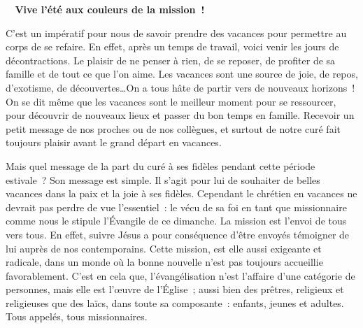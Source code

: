  \begin{center}
 \textbf{
\og 
Vive l’été aux couleurs de la mission !
 \fg{}
 }
 \end{center}

C’est un impératif pour nous de savoir prendre des vacances pour permettre au corps de se refaire. En effet, après un temps de travail, voici venir les jours de décontractions. Le plaisir de ne penser à rien, de se reposer, de profiter de sa famille et de tout ce que l’on aime. Les vacances sont une source de joie, de repos, d’exotisme, de découvertes…On a tous hâte de partir vers de nouveaux horizons ! On se dit même que les vacances sont le meilleur moment pour se ressourcer, pour découvrir de nouveaux lieux et passer du bon temps en famille. Recevoir un petit message de nos proches ou de nos collègues, et surtout de notre curé fait toujours plaisir avant le grand départ en vacances.

Mais quel message de la part du curé à ses fidèles pendant cette période estivale ? Son message est simple. Il s’agit pour lui de souhaiter de belles vacances dans la paix et la joie à ses fidèles.
Cependant le chrétien en vacances ne devrait pas perdre de vue l’essentiel : le vécu de sa foi en tant que missionnaire comme nous le stipule l’Évangile de ce dimanche. La mission est l’envoi de tous vers tous. En effet, suivre Jésus a pour conséquence d’être envoyés témoigner de lui auprès de nos contemporains.
Cette mission, est elle aussi exigeante et radicale, dans un monde où la bonne nouvelle n’est pas toujours accueillie favorablement. C’est en cela que, l’évangélisation n’est l’affaire d’une catégorie de personnes, mais elle est l’œuvre de l’Église ; aussi bien des prêtres, religieux et religieuses que des laïcs, dans toute sa composante : enfants, jeunes et adultes.
Tous appelés, tous missionnaires.

